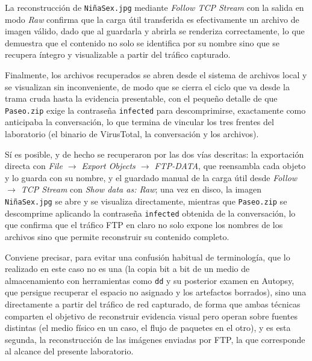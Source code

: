 \begin{analisis}
  La reconstrucción de \texttt{NiñaSex.jpg} mediante \emph{Follow TCP Stream} con la salida en modo \emph{Raw} confirma que la carga útil transferida es efectivamente un archivo de imagen válido, dado que al guardarla y abrirla se renderiza correctamente, lo que demuestra que el contenido no solo se identifica por su nombre sino que se recupera íntegro y visualizable a partir del tráfico capturado.
\end{analisis}


\begin{analisis}
  Finalmente, los archivos recuperados se abren desde el sistema de archivos local y se visualizan sin inconveniente, de modo que se cierra el ciclo que va desde la trama cruda hasta la evidencia presentable, con el pequeño detalle de que \texttt{Paseo.zip} exige la contraseña \texttt{infected} para descomprimirse, exactamente como anticipaba la conversación, lo que termina de vincular los tres frentes del laboratorio (el binario de VirusTotal, la conversación y los archivos).
\end{analisis}

\begin{respuesta}
  Sí es posible, y de hecho se recuperaron por las dos vías descritas: la exportación directa con \emph{File $\rightarrow$ Export Objects $\rightarrow$ FTP-DATA}, que reensambla cada objeto y lo guarda con su nombre, y el guardado manual de la carga útil desde \emph{Follow $\rightarrow$ TCP Stream} con \emph{Show data as: Raw}; una vez en disco, la imagen \texttt{NiñaSex.jpg} se abre y se visualiza directamente, mientras que \texttt{Paseo.zip} se descomprime aplicando la contraseña \texttt{infected} obtenida de la conversación, lo que confirma que el tráfico FTP en claro no solo expone los nombres de los archivos sino que permite reconstruir su contenido completo.
\end{respuesta}

Conviene precisar, para evitar una confusión habitual de terminología, que lo realizado en este caso no es una  (la copia bit a bit de un medio de almacenamiento con herramientas como \texttt{dd} y su posterior examen en Autopsy, que persigue recuperar el espacio no asignado y los artefactos borrados), sino una  directamente a partir del tráfico de red capturado, de forma que ambas técnicas comparten el objetivo de reconstruir evidencia visual pero operan sobre fuentes distintas (el medio físico en un caso, el flujo de paquetes en el otro), y es esta segunda, la reconstrucción de las imágenes enviadas por FTP, la que corresponde al alcance del presente laboratorio.

